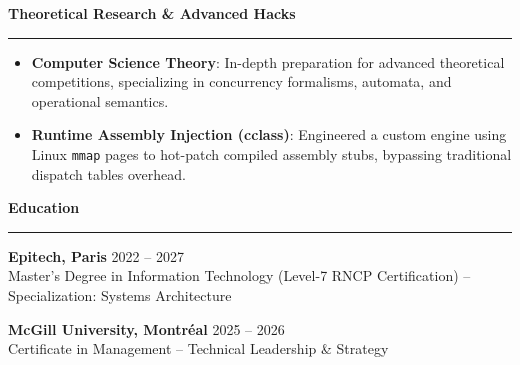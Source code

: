 \documentclass[9pt]{extarticle}
\begin{document}
{\large\bfseries Theoretical Research \& Advanced Hacks}
\par\vspace{-8pt}
\rule{\linewidth}{0.4pt}
\par\vspace{5pt}
\begin{itemize}[noitemsep, topsep=0pt]
    \item {\bfseries Computer Science Theory}: In-depth preparation for advanced theoretical competitions, specializing in concurrency formalisms, automata, and operational semantics.
    \item {\bfseries Runtime Assembly Injection (cclass)}: Engineered a custom engine using Linux \texttt{mmap} pages to hot-patch compiled assembly stubs, bypassing traditional dispatch tables overhead.
\end{itemize}

\par\vspace{5pt}

{\large\bfseries Education}
\par\vspace{-8pt}
\rule{\linewidth}{0.4pt}
\par\vspace{5pt}

{\bfseries Epitech, Paris} \hfill 2022 -- 2027 \\
Master's Degree in Information Technology (Level-7 RNCP Certification) -- Specialization: Systems Architecture

\vspace{4pt}

{\bfseries McGill University, Montréal} \hfill 2025 -- 2026 \\
Certificate in Management -- Technical Leadership \& Strategy
\end{document}
